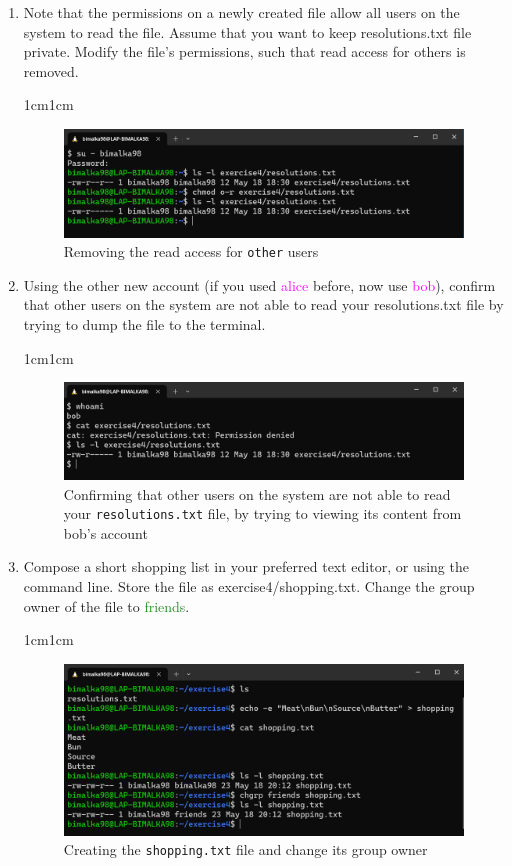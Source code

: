\documentclass[11pt,letterpaper]{article}
\newenvironment{answer}{\em \color{blue} \begin{adjustwidth}{1cm}{1cm}}{\end{adjustwidth}}
\begin{document}
\begin{enumerate}
		\item Note that the permissions on a newly created file allow all users on the system to read the file. Assume that you want to keep resolutions.txt file private. Modify the file's permissions, such that read access for others is removed. 
		
		\begin{answer}
			\begin{figure}[H]
				\centering
				\includegraphics[width=0.65\columnwidth]{images/q8}
				\caption{Removing the read access for {\tt other} users} \label{fig:q8}
			\end{figure}
		\end{answer}
		
		
		\item Using the other new account (if you used \textcolor{magenta}{alice} before, now use \textcolor{magenta}{bob}), confirm that other users on the system are not able to read your resolutions.txt file by trying to dump the file to the terminal.
		
		\begin{answer}
			\begin{figure}[H]
				\centering
				\includegraphics[width=0.65\columnwidth]{images/q9}
				\caption{Confirming that other users on the system are not able to read your {\tt resolutions.txt} file, by trying to viewing its content from bob's account} \label{fig:q9}
			\end{figure}
		\end{answer}
		
		\pagebreak
		\item Compose a short shopping list in your preferred text editor, or using the command line. Store the file as exercise4/shopping.txt. Change the group owner of the file to \textcolor{ForestGreen}{friends}.
		
		\begin{answer}
			\begin{figure}[H]
				\centering
				\includegraphics[width=0.65\columnwidth]{images/q10}
				\caption{Creating the {\tt shopping.txt} file and change its group owner} \label{fig:q10}
				\end{figure}
		\end{answer}
		

\end{enumerate}
\end{document}
